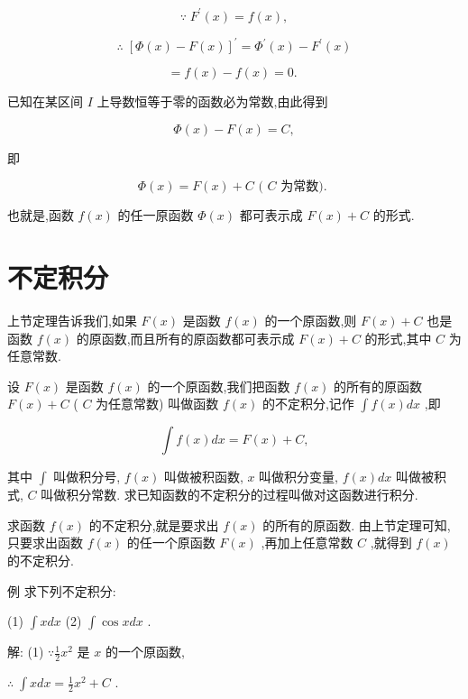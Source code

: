 \documentclass[lang=cn,newtx,10pt,scheme=chinese]{elegantbook}
\begin{document}
\[
\because \;{F}^{\prime }\left( x\right) = f\left( x\right) ,
\]

\[
\therefore \;{\left\lbrack \Phi \left( x\right) - F\left( x\right) \right\rbrack }^{\prime } = {\Phi }^{\prime }\left( x\right) - {F}^{\prime }\left( x\right)
\]

\[
= f\left( x\right) - f\left( x\right) = 0\text{. }
\]

已知在某区间 \(I\) 上导数恒等于零的函数必为常数,由此得到

\[
\Phi \left( x\right) - F\left( x\right) = C,
\]

即

\[
\Phi \left( x\right) = F\left( x\right) + C\text{ ( }C\text{ 为常数). }
\]

也就是,函数 \(f\left( x\right)\) 的任一原函数 \(\Phi \left( x\right)\) 都可表示成 \(F\left( x\right) + C\) 的形式.

\section{不定积分}

上节定理告诉我们,如果 \(F\left( x\right)\) 是函数 \(f\left( x\right)\) 的一个原函数,则 \(F\left( x\right) + C\) 也是函数 \(f\left( x\right)\) 的原函数,而且所有的原函数都可表示成 \(F\left( x\right) + C\) 的形式,其中 \(C\) 为任意常数.

设 \(F\left( x\right)\) 是函数 \(f\left( x\right)\) 的一个原函数,我们把函数 \(f\left( x\right)\) 的所有的原函数 \(F\left( x\right) + C\) ( \(C\) 为任意常数) 叫做函数 \(f\left( x\right)\) 的不定积分,记作 \(\int f\left( x\right) {dx}\) ,即

\[
\int f\left( x\right) {dx} = F\left( x\right) + C,
\]

其中 \(\int\) 叫做积分号, \(f\left( x\right)\) 叫做被积函数, \(x\) 叫做积分变量, \(f\left( x\right) {dx}\) 叫做被积式, \(C\) 叫做积分常数. 求已知函数的不定积分的过程叫做对这函数进行积分.

求函数 \(f\left( x\right)\) 的不定积分,就是要求出 \(f\left( x\right)\) 的所有的原函数. 由上节定理可知,只要求出函数 \(f\left( x\right)\) 的任一个原函数 \(F\left( x\right)\) ,再加上任意常数 \(C\) ,就得到 \(f\left( x\right)\) 的不定积分.

例 求下列不定积分:

(1) \(\int {xdx}\) (2) \(\int \cos {xdx}\) .

解: (1) \(\because \frac{1}{2}{x}^{2}\) 是 \(x\) 的一个原函数,

\(\therefore \;\int {xdx} = \frac{1}{2}{x}^{2} + C\) .
\end{document}
